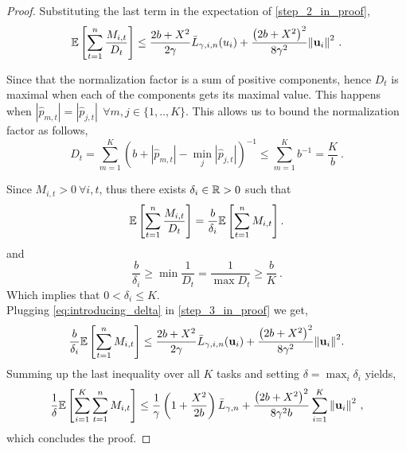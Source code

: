 {\begin{proof}
Substituting the last term in the expectation of
\eqref{step_2_in_proof}, %
\begin{equation}
\mathbb{E}\left[ \sum_{t=1}^{n}{\frac{M_{i,t}}{D_{t}}} \right]
\le \frac{2b+X^2}{2\gamma}{\bar
  L}_{\gamma,i,n}(u_i)+\frac{\left({2b+X^2}\right)^2}{8{\gamma}^2}{\left\Vert
    \mathbf{u}_{i} \right\Vert}^2~.
\label{step_3_in_proof}
\end{equation} 

Since that the normalization factor is a sum of positive components,
hence $D_t$ is maximal when each of the components gets its maximal
value. This happens when $\left\vert \hat{p}_{m,t}
\right\vert=\left\vert \hat{p}_{j,t} \right\vert ~~  \forall
m,j \in\{1,..,K\}$. This allows us to bound the normalization factor as
follows,
\begin{equation}
D_{t}=\sum_{m=1}^{K}{\left({b+\left\vert \hat{p}_{m,t}
      \right\vert-\min_{j}{\left\vert \hat{p}_{j,t}
        \right\vert}}\right)^{-1}} \le \sum_{m=1}^{K}{b^{-1}}=\frac{K}{b}~.
\label{bound_D}
\end{equation}


Since $M_{i,t}>0 ~\forall{i,t}$, thus there exists $\delta_i\in\mathbb{R}>0$ such that 
\begin{equation}
\label{eq:introducing_delta}
\mathbb{E}\left[{\sum_{t=1}^{n}{\frac{M_{i,t}}{D_{t}}}}\right] = 
\frac{b}{\delta_i}\mathbb{E}\left[{\sum_{t=1}^{n}{M_{i,t}}}\right].
\end{equation}
and
\[
\frac{b}{\delta_i} \geq \min\frac{1}{D_t}  = \frac{1}{\max D_t}  \geq 
\frac{b}{K}~.
\]
Which implies that $0<\delta_i\le K$.\\
Plugging \eqref{eq:introducing_delta} in \eqref{step_3_in_proof} we get,
\begin{equation}\label{eq:bound_for_i}
\frac{b}{\delta_i}\mathbb{E}\left[ \sum_{t=1}^{n}{M_{i,t}} \right]
\le \frac{2b+X^2}{2\gamma}{\bar L}_{\gamma,i,n}(\mathbf{u}_{i})+\frac{\left({2b+X^2}\right)^2}{8{\gamma}^2}{\left\Vert \mathbf{u}_{i} \right\Vert}^2.
\end{equation}
Summing up the last inequality over all $K$ tasks and setting $\delta
= \max_i \delta_i$ yields, 
\begin{equation}
\begin{split}
\frac{1}{\delta}\mathbb{E}\left[ \sum_{i=1}^{K}\sum_{t=1}^{n}{M_{i,t}} \right]
\le\frac{1}{\gamma}\left(1+\frac{X^2}{2b} \right){\bar L}_{\gamma,n}+
\frac{\left({2b+X^2}\right)^2}{8{\gamma}^2b}\sum_{i=1}^{K}{{\left\Vert \mathbf{u}_{i} 
\right\Vert}^2}~,
\end{split}
\label{final_eq}
\end{equation}
which concludes the proof.
\QED
\end{proof}

}
